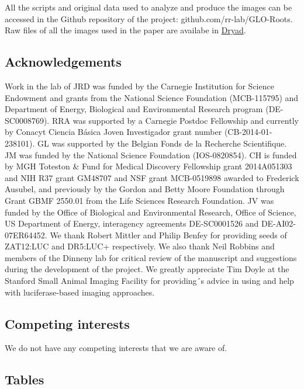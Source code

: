 \documentclass[]{article}
\begin{document}
All the scripts and original data used to analyze and produce the images
can be accessed in the Github repository of the project:
github.com/rr-lab/GLO-Roots. Raw files of all the images used in the
paper are availabe in
\href{http://datadryad.org/review?doi=doi:10.5061/dryad.4k37q}{Dryad}.

\subsection{Acknowledgements}\label{acknowledgements}

Work in the lab of JRD was funded by the Carnegie Institution for
Science Endowment and grants from the National Science Foundation
(MCB-115795) and Department of Energy, Biological and Environmental
Research program (DE-SC0008769). RRA was supported by a Carnegie Postdoc
Fellowship and currently by Conacyt Ciencia Básica Joven Investigador
grant number (CB-2014-01-238101). GL was supported by the Belgian Fonds
de la Recherche Scientifique. JM was funded by the National Science
Foundation (IOS-0820854). CH is funded by MGH Toteston \& Fund for
Medical Discovery Fellowship grant 2014A051303 and NIH R37 grant GM48707
and NSF grant MCB-0519898 awarded to Frederick Ausubel, and previously
by the Gordon and Betty Moore Foundation through Grant GBMF 2550.01 from
the Life Sciences Research Foundation. JV was funded by the Office of
Biological and Environmental Research, Office of Science, US Department
of Energy, interagency agreements DE-SC0001526 and DE-AI02-07ER64452. We
thank Robert Mittler and Philip Benfey for providing seeds of ZAT12:LUC
and DR5:LUC+ respectively. We also thank Neil Robbins and members of the
Dinneny lab for critical review of the manuscript and suggestions during
the development of the project. We greatly appreciate Tim Doyle at the
Stanford Small Animal Imaging Facility for providing´s advice in using
and help with luciferase-based imaging approaches.

\subsection{Competing interests}\label{competing-interests}

We do not have any competing interests that we are aware of.

\pagebreak

\subsection{Tables}\label{tables}
\end{document}
